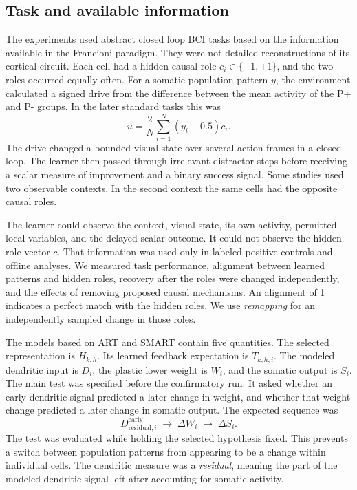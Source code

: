 \documentclass[11pt]{article}
\begin{document}
\subsection{Task and available information}
The experiments used abstract closed loop BCI tasks based on the information available in the Francioni paradigm. They were not detailed reconstructions of its cortical circuit. Each cell had a hidden causal role $c_i\in\{-1,+1\}$, and the two roles occurred equally often. For a somatic population pattern $y$, the environment calculated a signed drive from the difference between the mean activity of the P+ and P- groups. In the later standard tasks this was
\begin{equation}
 u=\frac{2}{N}\sum_{i=1}^{N}(y_i-0.5)c_i.
\end{equation}
The drive changed a bounded visual state over several action frames in a closed loop. The learner then passed through irrelevant distractor steps before receiving a scalar measure of improvement and a binary success signal. Some studies used two observable contexts. In the second context the same cells had the opposite causal roles.

The learner could observe the context, visual state, its own activity, permitted local variables, and the delayed scalar outcome. It could not observe the hidden role vector $c$. That information was used only in labeled positive controls and offline analyses. We measured task performance, alignment between learned patterns and hidden roles, recovery after the roles were changed independently, and the effects of removing proposed causal mechanisms. An alignment of 1 indicates a perfect match with the hidden roles. We use \emph{remapping} for an independently sampled change in those roles.

The models based on ART and SMART contain five quantities. The selected representation is $H_{k,h}$. Its learned feedback expectation is $T_{k,h,i}$. The modeled dendritic input is $D_i$, the plastic lower weight is $W_i$, and the somatic output is $S_i$. The main test was specified before the confirmatory run. It asked whether an early dendritic signal predicted a later change in weight, and whether that weight change predicted a later change in somatic output. The expected sequence was
\begin{equation}
 D^{\mathrm{early}}_{\mathrm{residual},i}\;\longrightarrow\;\Delta W_i\;\longrightarrow\;\Delta S_i.
\end{equation}
The test was evaluated while holding the selected hypothesis fixed. This prevents a switch between population patterns from appearing to be a change within individual cells. The dendritic measure was a \emph{residual}, meaning the part of the modeled dendritic signal left after accounting for somatic activity.
\end{document}
